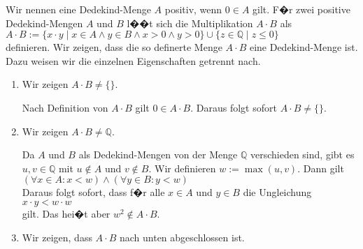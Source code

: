 \solution
Wir nennen eine Dedekind-Menge $A$ positiv, wenn $0 \in A$ gilt.  F�r zwei positive Dedekind-Mengen $A$
und $B$ l��t sich die Multiplikation $A \cdot B$ als
\\[0.2cm]
\hspace*{1.3cm}
$A \cdot B := \{ x \cdot y \mid x \in A \wedge y \in B \wedge x > 0 \wedge y > 0 \} \cup 
              \{ z \in \mathbb{Q} \mid z \leq 0 \}$
\\[0.2cm]
definieren.  Wir zeigen, dass die so definerte Menge $A \cdot B$ eine Dedekind-Menge ist.
Dazu weisen wir die einzelnen Eigenschaften getrennt nach.
\begin{enumerate}
\item Wir zeigen $A \cdot B \not= \{\}$.

      Nach Definition von $A \cdot B$ gilt $0 \in A \cdot B$.   Daraus folgt sofort $A \cdot B \not= \{\}$.
\item Wir zeigen $A \cdot B \not= \mathbb{Q}$.

      Da $A$ und $B$ als Dedekind-Mengen von der Menge $\mathbb{Q}$ verschieden sind, gibt es 
      $u,v \in \mathbb{Q}$ mit $u \not\in A$ und $v \not\in B$. Wir definieren $w := \max(u, v)$.  Dann gilt 
      \\[0.2cm]
      \hspace*{1.3cm}
      $(\forall x \in A: x < w) \wedge (\forall y \in B: y < w)$
      \\[0.2cm]
      Daraus folgt sofort, dass f�r alle $x \in A$ und $y \in B$ die Ungleichung
      \\[0.2cm]
      \hspace*{1.3cm}
      $x \cdot y < w \cdot w$
      \\[0.2cm]
      gilt.  Das hei�t aber $w^2 \not\in A \cdot B$.
\item Wir zeigen, dass $A \cdot B$ nach unten abgeschlossen ist.


\end{enumerate}
